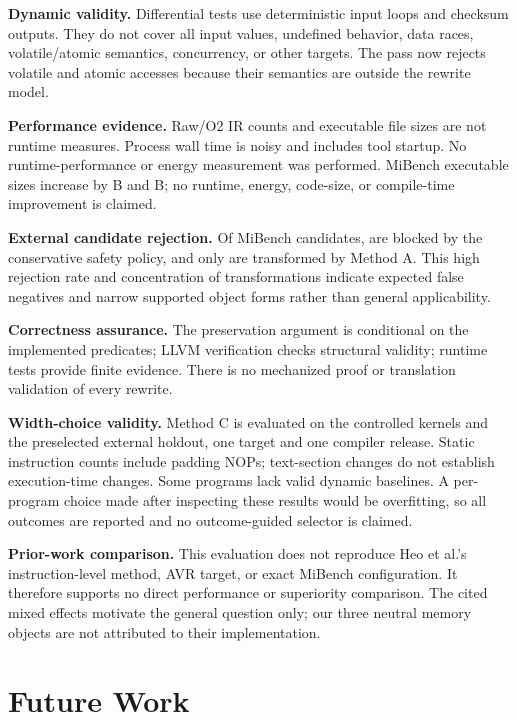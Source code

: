 \documentclass[11pt,twocolumn]{article}
\begin{document}
\textbf{Dynamic validity.} Differential tests use deterministic input loops and
checksum outputs. They do not cover all input values, undefined behavior, data
races, volatile/atomic semantics, concurrency, or other targets. The pass now
rejects volatile and atomic accesses because their semantics are outside the
rewrite model.

\textbf{Performance evidence.} Raw/O2 IR counts and executable file sizes are
not runtime measures. Process wall time is noisy and includes tool startup. No
runtime-performance or energy measurement was performed. MiBench executable sizes increase
by \ExternalAExecutableDelta{} B and \ExternalBExecutableDelta{} B; no runtime,
energy, code-size, or compile-time improvement is claimed.

\textbf{External candidate rejection.} Of \ExternalCandidates{} MiBench
candidates, \ExternalBlocked{} are blocked by the conservative safety policy,
and only \ExternalATransformed{} are transformed by Method A. This high
rejection rate and concentration of transformations indicate expected false
negatives and narrow supported object forms rather than general applicability.

\textbf{Correctness assurance.} The preservation argument is conditional on the
implemented predicates; LLVM verification checks structural validity; runtime
tests provide finite evidence. There is no mechanized proof or translation
validation of every rewrite.

\textbf{Width-choice validity.} Method C is evaluated on the controlled kernels
and the preselected external holdout, one target and one compiler release.
Static instruction counts include padding NOPs; text-section changes do not
establish execution-time changes. Some programs lack valid dynamic baselines.
A per-program choice made after inspecting these results would be overfitting,
so all outcomes are reported and no outcome-guided selector is claimed.

\textbf{Prior-work comparison.} This evaluation does not reproduce Heo et
al.'s instruction-level method, AVR target, or exact MiBench configuration. It therefore
supports no direct performance or superiority comparison. The cited mixed
effects motivate the general question only; our three neutral memory objects
are not attributed to their implementation.

\section{Future Work}
\end{document}
